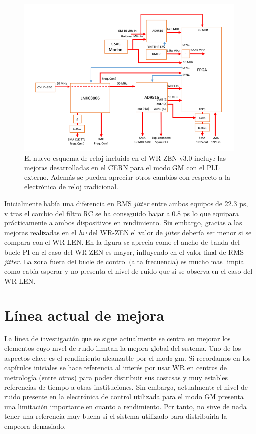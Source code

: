 \begin{figure}
	\centering
	\includegraphics[width=\linewidth]{imagenes/clknewschema}
	\caption[Nuevo esquema de reloj incluido en el WR-ZEN v3.0]{El nuevo 
		esquema de reloj incluido en el WR-ZEN v3.0 incluye las mejoras 
		desarrolladas en el CERN para el modo GM con el PLL externo. Además se 
		pueden apreciar otros cambios con respecto a la electrónica de reloj 
		tradicional.}
	\label{fig:clknewschema}
\end{figure}

Inicialmente había una diferencia en RMS \textit{jitter} entre ambos equipos de 
22.3 ps, y tras el cambio del filtro RC se ha conseguido bajar a 0.8 ps lo que 
equipara prácticamente a ambos dispositivos en rendimiento. Sin embargo, 
gracias a las mejoras realizadas en el \textit{hw} del WR-ZEN el valor de 
\textit{jitter} debería ser menor si se compara con el WR-LEN. En la figura se 
aprecia como el ancho de banda del bucle PI en el caso del WR-ZEN es mayor, 
influyendo en el valor final de RMS \textit{jitter}. La zona fuera del bucle de 
control (alta frecuencia) es mucho más limpia como cabía esperar y no presenta 
el nivel de ruido que si se observa en el caso del WR-LEN.

\section{Línea actual de mejora} \label{sec:gm}


La línea de investigación que se sigue actualmente se centra en mejorar los 
elementos cuyo nivel de ruido limitan la mejora global del sistema. Uno de los 
aspectos clave es el rendimiento alcanzable por el modo \acrlong{gm}. Si 
recordamos en los capítulos iniciales se hace referencia al interés por usar WR 
en centros de metrología (entre otros) para poder distribuir sus costosas y muy 
estables referencias de tiempo a otras instituciones. Sin embargo, actualmente 
el nivel de ruido presente en la electrónica de control utilizada para el modo 
GM presenta una limitación importante en cuanto a rendimiento. Por tanto, no 
sirve de nada tener una referencia muy buena si el sistema utilizado para 
distribuirla la empeora demasiado. 

